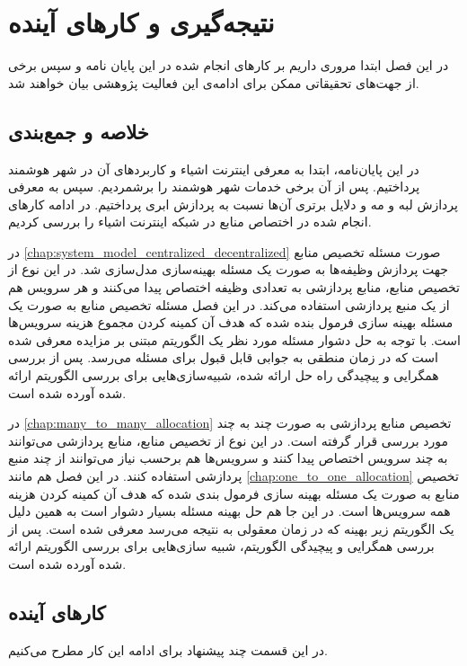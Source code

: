 \chapter{نتیجه‌گیری و کار‌های آینده}\label{chap:conclusion}
  \thispagestyle{empty}
  در این فصل ابتدا مروری داریم بر کار‌های انجام شده در این پایان نامه و سپس برخی از جهت‌های تحقیقاتی ممکن برای ادامه‌ی این فعالیت پژوهشی بیان خواهند شد.

  \section{خلاصه و جمع‌بندی}
    در این پایان‌نامه، ابتدا به معرفی اینترنت اشیاء و کاربرد‌های آن در شهر هوشمند پرداختیم.
    پس از آن برخی خدمات شهر هوشمند را برشمردیم.
    سپس به معرفی پردازش لبه و مه و دلایل برتری آن‌ها نسبت به پردازش ابری پرداختیم.
    در ادامه کار‌های انجام شده در اختصاص منابع در شبکه اینترنت اشیاء را بررسی کردیم.

    در \cref{chap:system_model_centralized_decentralized} صورت مسئله تخصیص منابع جهت پردازش وظیفه‌ها به صورت یک مسئله بهینه‌سازی مدل‌سازی شد. 
    در این نوع از تخصیص منابع، منابع پردازشی به تعدادی وظیفه اختصاص پیدا می‌کنند و هر سرویس هم از یک منبع پردازشی استفاده می‌کند.
    در این فصل مسئله تخصیص منابع به صورت یک مسئله بهینه سازی فرمول بنده شده که هدف آن کمینه کردن مجموع هزینه سرویس‌ها است.
    با توجه به حل دشوار مسئله مورد نظر یک الگوریتم مبتنی بر مزایده معرفی شده است که در زمان منطقی به جوابی قابل قبول برای مسئله می‌رسد.
    پس از بررسی همگرایی و پیچیدگی راه حل ارائه شده، شبیه‌سازی‌هایی برای بررسی الگوریتم ارائه شده آورده شده است.

    در \cref{chap:many_to_many_allocation} تخصیص منابع پردازشی به صورت چند به چند مورد بررسی قرار گرفته است.
    در این نوع از تخصیص منابع، منابع پردازشی می‌توانند به چند سرویس اختصاص پیدا کنند و سرویس‌ها هم برحسب نیاز می‌توانند از چند منبع پردازشی استفاده کنند.
    در این فصل هم مانند \cref{chap:one_to_one_allocation} تخصیص منابع به صورت یک مسئله بهینه سازی فرمول بندی شده که هدف آن کمینه کردن هزینه همه سرویس‌ها است.
    در این جا هم حل بهینه مسئله بسیار دشوار است به همین دلیل یک الگوریتم زیر بهینه که در زمان معقولی به نتیجه می‌رسد معرفی شده است.
    پس از بررسی همگرایی و پیچیدگی الگوریتم، شبیه سازی‌هایی برای بررسی الگوریتم ارائه شده آورده شده است.

  \section{کار‌های آینده}
    در این قسمت چند پیشنهاد برای ادامه این کار مطرح می‌کنیم.
  
